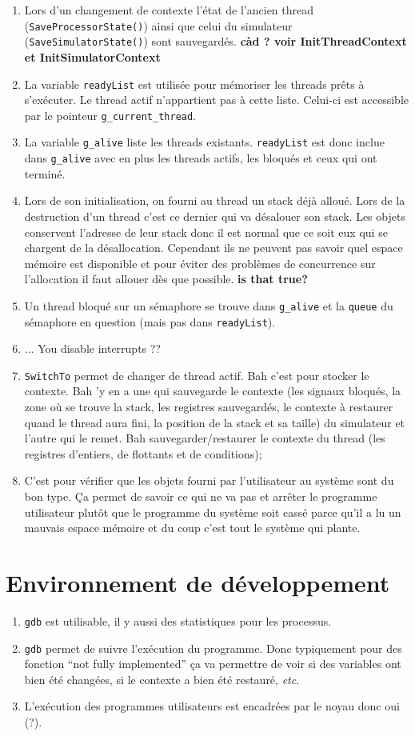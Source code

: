 \documentclass{article}
\begin{document}
\begin{enumerate}
\item Lors d'un changement de contexte l'état de l'ancien thread ({\tt SaveProcessorState()}) ainsi que celui du simulateur ({\tt SaveSimulatorState()}) sont sauvegardés. {\bf càd ? voir InitThreadContext et InitSimulatorContext}
\item La variable {\tt readyList} est utilisée pour mémoriser les threads prêts à s'exécuter. Le thread actif n'appartient pas à cette liste. Celui-ci est accessible par le pointeur {\tt g\_current\_thread}.
\item La variable {\tt g\_alive} liste les threads existants. {\tt readyList} est donc inclue dans {\tt g\_alive} avec en plus les threads actifs, les bloqués et ceux qui ont terminé.
\item Lors de son initialisation, on fourni au thread un stack déjà alloué. Lors de la destruction d'un thread c'est ce dernier qui va désalouer son stack. Les objets conservent l'adresse de leur stack donc il est normal que ce soit eux qui se chargent de la désallocation. Cependant ils ne peuvent pas savoir quel espace mémoire est disponible et pour éviter des problèmes de concurrence sur l'allocation il faut allouer dès que possible. {\bf is that true?}
\item Un thread bloqué sur un sémaphore se trouve dans {\tt g\_alive} et la {\tt queue} du sémaphore en question (mais pas dans {\tt readyList}).
\item ... You disable interrupts ??
\item {\tt SwitchTo} permet de changer de thread actif. Bah c'est pour stocker le contexte. Bah 'y en a une qui sauvegarde le contexte (les signaux bloqués, la zone où se trouve la stack, les registres sauvegardés, le contexte à restaurer quand le thread aura fini, la position de la stack et sa taille) du simulateur et l'autre qui le remet. Bah sauvegarder/restaurer le contexte du thread (les registres d'entiers, de flottants et de conditions);
\item C'est pour vérifier que les objets fourni par l'utilisateur au système sont du bon type. Ça permet de savoir ce qui ne va pas et arrêter le programme utilisateur plutôt que le programme du système soit cassé parce qu'il a lu un mauvais espace mémoire et du coup c'est tout le système qui plante.
\end{enumerate}

\section{Environnement de développement}

\begin{enumerate}
\item {\tt gdb} est utilisable, il y aussi des statistiques pour les processus.
\item {\tt gdb} permet de suivre l'exécution du programme. Donc typiquement pour des fonction ``not fully implemented'' ça va permettre de voir si des variables ont bien été changées, si le contexte a bien été restauré, {\it etc}.
\item L'exécution des programmes utilisateurs est encadrées par le noyau donc oui (?).
\end{enumerate}
\end{document}
